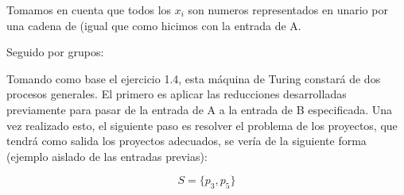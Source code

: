 Tomamos en cuenta que todos los $x_i$ son numeros representados en unario por 
una cadena de  (igual que como hicimos con la entrada de A.

Seguido por grupos:

\begin{center}
\end{center}

Tomando como base el ejercicio 1.4, esta máquina de Turing constará de dos 
procesos generales. El primero es aplicar las reducciones desarrolladas 
previamente para pasar de la entrada de A a la entrada de B especificada. 
Una vez realizado esto, el siguiente paso es resolver el problema de los
proyectos, que tendrá como salida los proyectos adecuados, se vería de la
siguiente forma (ejemplo aislado de las entradas previas):

\[
  S = \{p_3, p_5\}
\]

